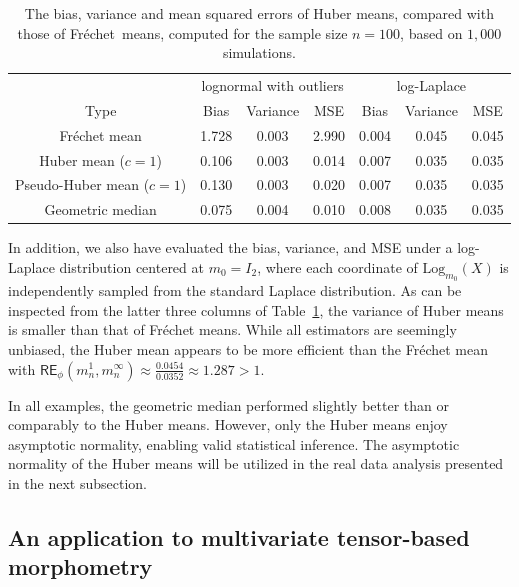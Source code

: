 \documentclass[preprint]{imsart}
\def\Frechet{Fr\'{e}chet}
\theoremstyle{plain}
\theoremstyle{remark}
\begin{document}
  \begin{table}[t]
\centering
\caption{The bias, variance and mean squared errors of Huber means, compared with those of \Frechet\ means, computed for the sample size $n = 100$, based on $1,000$ simulations. \label{table:num_result}}
\begin{tabular}{c||ccc|ccc}
  \multicolumn{1}{c}{}   & \multicolumn{3}{c}{lognormal with outliers} & \multicolumn{3}{c}{log-Laplace}\\ 
Type & Bias & Variance &MSE & Bias & Variance &MSE \\ \hline
Fr\'{e}chet mean & 1.728 & 0.003 & 2.990 & 0.004 & 0.045 & 0.045\\ 
Huber mean ($c=1$) & 0.106 & 0.003 & 0.014 & 0.007 & 0.035 & 0.035\\  
Pseudo-Huber mean ($c=1$) & 0.130 & 0.003 & 0.020 & 0.007 & 0.035 & 0.035 \\ 
Geometric median & 0.075 & 0.004 & 0.010 & 0.008 & 0.035 & 0.035
\end{tabular}
\end{table}


In addition, we also have evaluated the bias, variance, and MSE under a log-Laplace distribution centered at $m_0 = I_2$, where each coordinate of 
$ \mbox{Log}_{m_0}(X) $ is independently sampled from the standard Laplace distribution. As can be inspected from the latter three columns of Table~\ref{table:num_result}, the variance of Huber means is smaller than that of Fr\'{e}chet means. While all estimators are seemingly unbiased, the Huber mean appears to be more efficient than the Fr\'{e}chet mean with $\textsf{RE}_{\phi}(m^{1}_{n}, m^{\infty}_{n}) \approx \frac{0.0454}{0.0352} \approx 1.287 > 1$. 

In all examples, the geometric median performed slightly better than or comparably to the Huber means. However, only the Huber means enjoy asymptotic normality, enabling valid statistical inference. The asymptotic normality of the Huber means will be utilized in the real data analysis presented in the next subsection.

 

 

\subsection{An application to multivariate tensor-based morphometry
}\label{subsec:TBM}
 
\end{document}
